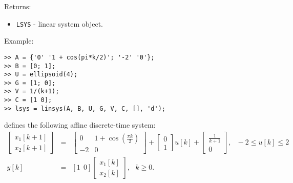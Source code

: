 Returns:
\begin{itemize}
\item {\tt LSYS} - linear system object.
\end{itemize}

Example:
{\tt \begin{verbatim}
>> A = {'0' '1 + cos(pi*k/2)'; '-2' '0'};
>> B = [0; 1];
>> U = ellipsoid(4);
>> G = [1; 0];
>> V = 1/(k+1);
>> C = [1 0];
>> lsys = linsys(A, B, U, G, V, C, [], 'd');
\end{verbatim} }

defines the following affine discrete-time system:
\begin{eqnarray*}
\left[\begin{array}{c}
x_1[k+1]\\
x_2[k+1]\end{array}\right] & = & \left[\begin{array}{cc}
0 & 1 + \cos(\frac{\pi k}{2})\\
-2 & 0\end{array}\right] + \left[\begin{array}{c}
0\\
1\end{array}\right]u[k] + \left[\begin{array}{c}
\frac{1}{k+1}\\
0\end{array}\right], ~~~ -2\leq u[k]\leq2\\
y[k] & = & [1 ~~ 0]\left[\begin{array}{c}
x_1[k]\\
x_2[k]\end{array}\right], ~~~ k\geq0.
\end{eqnarray*}























\newpage


















